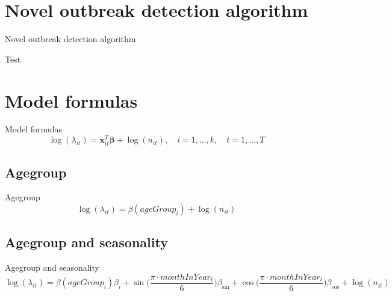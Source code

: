\documentclass[aspectratio=169]{beamer}
\begin{document}
\hypertarget{novel-outbreak-detection-algorithm}{%
\section{Novel outbreak detection
algorithm}\label{novel-outbreak-detection-algorithm}}

\begin{frame}{Novel outbreak detection algorithm}
\begin{algorithm}[H]
\caption{Test}
\end{algorithm}
\end{frame}

\hypertarget{model-formulas}{%
\section{Model formulas}\label{model-formulas}}

\begin{frame}{Model formulas}
\begin{equation}
  \log(\lambda_{it})=\boldsymbol{x}_{it}^T\boldsymbol{\beta}+\log(n_{it}), \quad i=1,\dots,k, \quad t=1,\dots,T
\end{equation}
\end{frame}

\hypertarget{agegroup}{%
\subsection{Agegroup}\label{agegroup}}

\begin{frame}{Agegroup}
\begin{equation}
  \log(\lambda_{it}) = \beta(ageGroup_{i}) + \log(n_{it})
\end{equation}
\end{frame}

\hypertarget{agegroup-and-seasonality}{%
\subsection{Agegroup and seasonality}\label{agegroup-and-seasonality}}

\begin{frame}{Agegroup and seasonality}
\begin{equation}
  \log(\lambda_{it}) = \beta(ageGroup_{i}) \beta_i + \sin\Big(\frac{\pi\cdot monthInYear_t}{6}\Big) \beta_{\sin} + \cos\Big(\frac{\pi \cdot monthInYear_t}{6}\Big) \beta_{\cos} + \log(n_{it})
\end{equation}
\end{frame}
\end{document}
